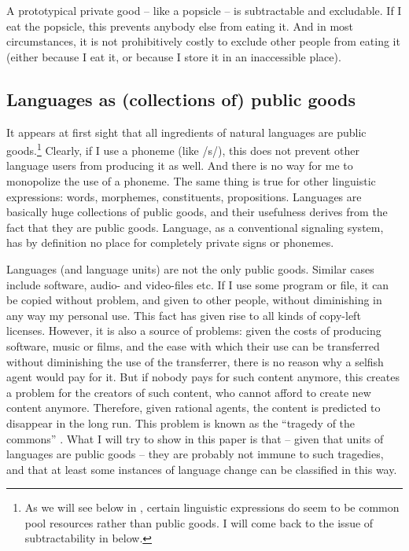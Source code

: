 \documentclass[output=paper,hidelinks]{langscibook}
\begin{document}
A prototypical private good -- like a popsicle -- is subtractable and excludable. If I eat the popsicle, this prevents anybody else from eating it. And in most circumstances, it is not prohibitively costly to exclude other people from eating it (either because I eat it, or because I store it in an inaccessible place).

\subsection{Languages as (collections of) public goods}
\label{sec:lang-as-coll}


It appears at first sight that all ingredients of natural languages are public goods.\footnote{As we will see below in , certain linguistic expressions do seem to be common pool resources rather than public goods. I will come back to the issue of subtractability in  below.} Clearly, if I use a phoneme (like /s/), this does not prevent other language users from producing it as well. And there is no way for me to monopolize the use of a phoneme. The same thing is true for other linguistic expressions: words, morphemes, constituents, propositions. Languages are basically huge collections of public goods, and their  usefulness derives from the fact that they are public goods. Language, as a conventional signaling system, has by definition no place for completely private signs or phonemes.

Languages (and language units) are not the only public goods. Similar cases include software, audio- and video-files etc. If I use some program or file, it can be copied without problem, and given to other people, without diminishing in any way my personal use. This fact has given rise to all kinds of copy-left licenses. However, it is also a source of problems: given the costs of producing software, music or films, and the ease with which their use can be transferred without diminishing the use of the transferrer, there is no reason why a selfish agent would pay for it. But if nobody pays for such content anymore, this creates a problem for the creators of such content, who cannot afford to create new content anymore. Therefore, given rational agents, the content is predicted to disappear in the long run. This problem is known as the ``tragedy of the commons'' \citep[see][]{Hardin1243}. What I will try to show in this paper is that -- given that units of languages are public goods -- they are probably not immune to such tragedies, and that at least some instances of language change can be classified in this way.
\end{document}
